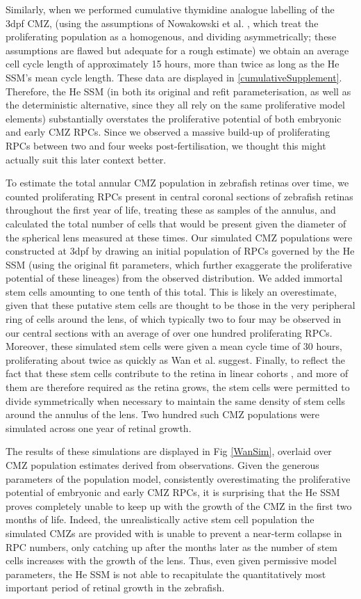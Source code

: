 Similarly, when we performed cumulative thymidine analogue labelling of the 3dpf CMZ, (using the assumptions of Nowakowski et al. \cite{Nowakowski1989}, which treat the proliferating population as a homogenous, and dividing asymmetrically; these assumptions are flawed but adequate for a rough estimate) we obtain an average cell cycle length of approximately 15 hours, more than twice as long as the He SSM's mean cycle length. These data are displayed in \ref{cumulativeSupplement}. Therefore, the He SSM (in both its original and refit parameterisation, as well as the deterministic alternative, since they all rely on the same proliferative model elements) substantially overstates the proliferative potential of both embryonic and early CMZ RPCs. Since we observed a massive build-up of proliferating RPCs between two and four weeks post-fertilisation, we thought this might actually suit this later context better.

To estimate the total annular CMZ population in zebrafish retinas over time, we counted proliferating RPCs present in central coronal sections of zebrafish retinas throughout the first year of life, treating these as samples of the annulus, and calculated the total number of cells that would be present given the diameter of the spherical lens measured at these times. Our simulated CMZ populations were constructed at 3dpf by drawing an initial population of RPCs governed by the He SSM (using the original fit parameters, which further exaggerate the proliferative potential of these lineages) from the observed distribution. We added immortal stem cells amounting to one tenth of this total. This is likely an overestimate, given that these putative stem cells are thought to be those in the very peripheral ring of cells around the lens, of which typically two to four may be observed in our central sections with an average of over one hundred proliferating RPCs. Moreover, these simulated stem cells were given a mean cycle time of 30 hours, proliferating about twice as quickly as Wan et al. suggest. Finally, to reflect the fact that these stem cells contribute to the retina in linear cohorts \cite{Centanin2014}, and more of them are therefore required as the retina grows, the stem cells were permitted to divide symmetrically when necessary to maintain the same density of stem cells around the annulus of the lens. Two hundred such CMZ populations were simulated across one year of retinal growth.

The results of these simulations are displayed in Fig \ref{WanSim}, overlaid over CMZ population estimates derived from observations. Given the generous parameters of the population model, consistently overestimating the proliferative potential of embryonic and early CMZ RPCs, it is surprising that the He SSM proves completely unable to keep up with the growth of the CMZ in the first two months of life. Indeed, the unrealistically active stem cell population the simulated CMZs are provided with is unable to prevent a near-term collapse in RPC numbers, only catching up after the months later as the number of stem cells increases with the growth of the lens. Thus, even given permissive model parameters, the He SSM is not able to recapitulate the quantitatively most important period of retinal growth in the zebrafish.

